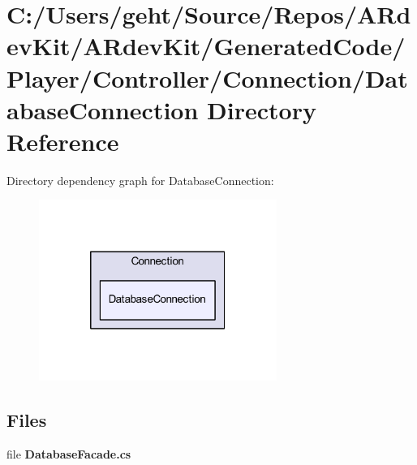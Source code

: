 \section{C\-:/\-Users/geht/\-Source/\-Repos/\-A\-Rdev\-Kit/\-A\-Rdev\-Kit/\-Generated\-Code/\-Player/\-Controller/\-Connection/\-Database\-Connection Directory Reference}
\label{dir_39c592cc8a50901c989ce353746a04c4}
Directory dependency graph for Database\-Connection\-:
\nopagebreak
\begin{figure}[H]
\begin{center}
\leavevmode
\includegraphics[width=220pt]{dir_39c592cc8a50901c989ce353746a04c4_dep}
\end{center}
\end{figure}
\subsection*{Files}
\begin{DoxyCompactItemize}
\item 
file {\bfseries Database\-Facade.\-cs}
\end{DoxyCompactItemize}
